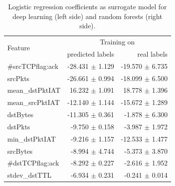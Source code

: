 \documentclass[sigconf,nonacm]{acmart}
\begin{document}
 \begin{table}
 \caption{Logistic regression coefficients as surrogate model for deep learning (left side) and random forests (right side).} \label{tab:logreg_coeff}
\begin{tabular}{l r r} \toprule 
\multirow{2}{*}{Feature} & \multicolumn{2}{c}{Training on} \\
  & predicted labels & real labels \\ \midrule
    \#srcTCPflag:ack &  -28.431 $\pm$ 1.129 &  -19.570 $\pm$ 6.735 \\
             srcPkts &  -26.661 $\pm$ 0.994 &  -18.099 $\pm$ 6.500 \\
     mean\_dstPktIAT &   16.232 $\pm$ 1.091 &   18.778 $\pm$ 1.396 \\
     mean\_srcPktIAT &  -12.140 $\pm$ 1.144 &  -15.672 $\pm$ 1.289 \\
            dstBytes &  -11.305 $\pm$ 0.361 &   -1.878 $\pm$ 6.300 \\
             dstPkts &   -9.750 $\pm$ 0.158 &   -3.987 $\pm$ 1.972 \\
      min\_dstPktIAT &   -9.216 $\pm$ 1.157 &  -12.533 $\pm$ 1.477 \\
            srcBytes &   -8.994 $\pm$ 4.744 &   -5.373 $\pm$ 3.870 \\
    \#dstTCPflag:ack &   -8.292 $\pm$ 0.227 &   -2.616 $\pm$ 1.952 \\
       stdev\_dstTTL &   -6.934 $\pm$ 0.231 &   -0.241 $\pm$ 0.014 \\

\end{tabular}
\end{table}
\end{document}
